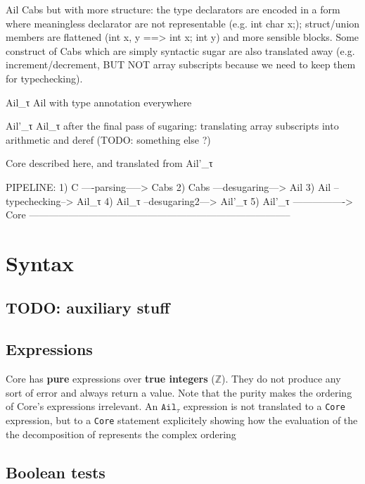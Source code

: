 \documentclass[12pt, a4paper]{article}
\newcommand{\Z}{\ensuremath{\mathbb{Z}}}
\begin{document}
Ail    Cabs but with more structure: the type declarators are encoded in a form
       where meaningless declarator are not representable (e.g. int char x;);
       struct/union members are flattened (int x, y ==> int x; int y) and more
       sensible blocks. Some construct of Cabs which are simply syntactic sugar
       are also translated away (e.g. increment/decrement, BUT NOT array
       subscripts because we need to keep them for typechecking).

Ail\_τ    Ail with type annotation everywhere

Ail'\_τ    Ail\_τ after the final pass of sugaring: translating array subscripts
          into arithmetic and deref (TODO: something else ?)

Core    described here, and translated from Ail'\_τ


PIPELINE:
  1) C      ----parsing-----> Cabs
  2) Cabs   ---desugaring---> Ail
  3) Ail    --typechecking--> Ail\_τ
  4) Ail\_τ  --desugaring2---> Ail'\_τ
  5) Ail'\_τ ----------------> Core
--------------------------------------------------------------------------------


\section{Syntax}

\subsection{TODO: auxiliary stuff}
\ottmetavars


\subsection{Expressions}
Core has {\bf pure} expressions over {\bf true integers} ($\Z$). They
do not produce any sort of error and always return a value. Note that
the purity makes the ordering of Core's expressions irrelevant. An
$\texttt{Ail}_\tau$ expression is not translated to a \texttt{Core}
expression, but to a \texttt{Core} statement explicitely showing how
the evaluation of the the
decomposition of 
represents the complex ordering

\ottgrammartabular{
  \otteop\ottinterrule
  \ottE\ottafterlastrule
}


\subsection{Boolean tests}
\ottgrammartabular{
  \ottbop\ottinterrule
  \ottconnective\ottinterrule
  \ottB\ottafterlastrule
}
\end{document}
